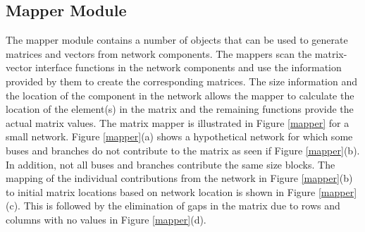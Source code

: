\documentclass{acm_proc_article-sp}
\begin{document}
\subsection{Mapper Module}
The mapper module contains a number of objects that can be used to generate
matrices and vectors from network components. The mappers scan the matrix-vector
interface functions in the network components and use the information provided
by them to create the corresponding matrices. The size information and the
location of the component in the network allows the mapper to calculate the
location of the element(s) in the matrix and the remaining functions provide the
actual matrix values. The matrix mapper is illustrated in Figure \ref{mapper}
for a small network.
Figure \ref{mapper}(a) shows a hypothetical network for which some buses and
branches do not contribute to the matrix as seen if Figure \ref{mapper}(b).
In addition, not all buses and branches contribute
the same size blocks. The mapping of the individual contributions from the
network in Figure \ref{mapper}(b) to initial matrix locations based on network
location is shown in Figure \ref{mapper}(c). This is followed by the elimination
of gaps in the matrix due to rows and columns with no values in Figure
\ref{mapper}(d).
\end{document}
